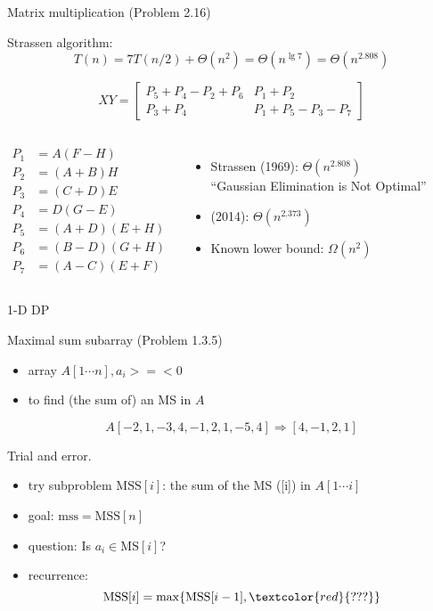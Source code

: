 \begin{frame}{Matrix multiplication (Problem 2.16)}
  \begin{block}{Strassen algorithm:}
    \[
      T(n) = 7T(n/2) + \Theta(n^2) = \Theta(n^{\lg {7}}) = \Theta(n^{2.808})
    \]
  \end{block}

  \[
	XY = \begin{bmatrix} P_5 + P_4 - P_2 + P_6 & P_1 + P_2 \\ P_3 + P_4 & P_1 + P_5 - P_3 - P_7 \end{bmatrix}
  \]

  \begin{columns}
	{\footnotesize
	  \begin{align*}
		P_1 &= A(F - H) \\
		P_2 &= (A + B)H \\
		P_3 &= (C + D)E \\
		P_4 &= D(G - E) \\
		P_5 &= (A + D)(E + H) \\
		P_6 &= (B - D)(G + H) \\
		P_7 &= (A - C)(E + F)
	  \end{align*}
	}
	  \pause
	  \begin{itemize}
		\item Strassen (1969): $\Theta(n^{2.808})$ \\
		  ``Gaussian Elimination is Not Optimal''
		  \pause
		\item (2014): $\Theta(n^{2.373})$
		  \pause
		\item Known lower bound: $\Omega(n^{2})$
	  \end{itemize}
  \end{columns}
\end{frame}
\begin{frame}{1-D DP}
  \begin{exampleblock}{Maximal sum subarray (Problem 1.3.5)}
    \begin{itemize}
      \item array $A[1 \cdots n], a_{i} >=< 0$
      \item to find (the sum of) an MS in $A$
    \end{itemize}
	
    \[
      A[-2,1 ,-3,4,-1,2,1,-5,4] \Rightarrow [4,-1,2,1]
    \]
  \end{exampleblock}

  \pause
  \begin{alertblock}{Trial and error.}
    \begin{itemize}
      \item try subproblem $\text{MSS}[i]$: the sum of the MS ([i]) in $A[1 \cdots i]$
      \item goal: $\text{mss} = \text{MSS}[n]$
      \item question: Is $a_{i} \in \text{MS}[i]$?
      \item recurrence: 
	\[ 
	  \text{MSS}[i] = \max \set{\text{MSS}[i-1], \textcolor{red}{???}}
	\]
    \end{itemize}
  \end{alertblock}
\end{frame}
